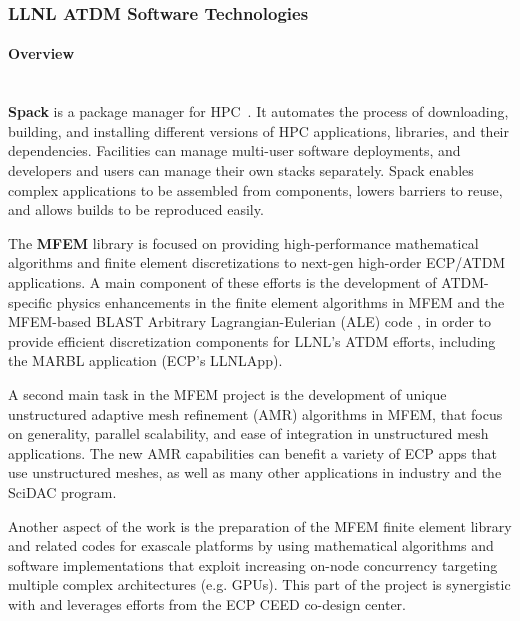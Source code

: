 \subsubsection{ LLNL ATDM Software Technologies}

\paragraph{Overview} \leavevmode \\

\textbf{Spack} is a package manager for
HPC~\cite{stewart+:sc19-spack-bof,gamblin+:sc19-spack-tutorial,gamblin+:lanl-spack-tutorial-2019,gamblin+:doe-nsf-spack-tutorial,baber+:pearc19-spack-tutorial,gamblin+:isc19-spack-tutorial,gamblin+:ecp19-spack-roundtable,gamblin+:ecp19-spack-tutorial,gamblin+:sc18-spack-bof,gamblin+:sc18-spack-tutorial,gamblin+:ecp18-spack-sotu,gamblin+:ecp18-spack-tutorial,gamblin+:sc17-spack-tutorial,gamblin:hpckp17,gamblin+:llnl-spack-tutorial-17,gamblin+:sc16-spack-tutorial}.
It automates the process of downloading, building, and installing
different versions of HPC applications, libraries, and their
dependencies.  Facilities can manage multi-user software deployments, and
developers and users can manage their own stacks separately.  Spack
enables complex applications to be assembled from components, lowers
barriers to reuse, and allows builds to be reproduced easily.

The \textbf{MFEM} library
\cite{MFEM} is focused on providing high-performance mathematical algorithms
and finite element discretizations to next-gen high-order ECP/ATDM
applications. A main component of these efforts is the development of
ATDM-specific physics enhancements in the finite element algorithms in
MFEM and the MFEM-based BLAST Arbitrary Lagrangian-Eulerian (ALE)
code \cite{BLAST}, in order to provide efficient discretization
components for LLNL's ATDM efforts, including the MARBL application
(ECP's LLNLApp).

A second main task in the MFEM project is the development of unique unstructured
adaptive mesh refinement (AMR) algorithms in MFEM, that focus on generality,
parallel scalability, and ease of integration in unstructured mesh
applications. The new AMR capabilities can benefit a variety of ECP apps that
use unstructured meshes, as well as many other applications in industry and the
SciDAC program.

Another aspect of the work is the preparation of the MFEM finite element library
and related codes for exascale platforms by using mathematical algorithms and
software implementations that exploit increasing on-node concurrency targeting
multiple complex architectures (e.g. GPUs). This part of the project is
synergistic with and leverages efforts from the ECP CEED co-design center.

